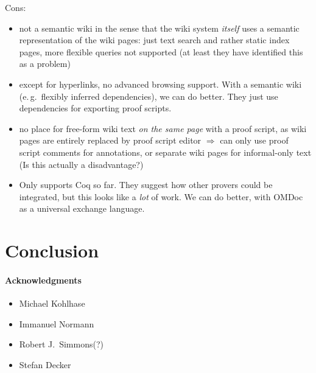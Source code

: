 \documentclass{llncs}
\begin{document}
\begin{todo}
  Cons:
  \begin{itemize}
  \item not a semantic wiki in the sense that the wiki system \emph{itself} uses a
    semantic representation of the wiki pages: just text search and rather static index
    pages, more flexible queries not supported (at least they have identified this as a
    problem)
  \item except for hyperlinks, no advanced browsing support.  With a semantic wiki
    (e.\,g.\ flexibly inferred dependencies), we can do better.  They just use
    dependencies for exporting proof scripts.
  \item no place for free-form wiki text \emph{on the same page} with a proof script, as
    wiki pages are entirely replaced by proof script editor $\Rightarrow$ can only use
    proof script comments for annotations, or separate wiki pages for informal-only text
    (Is this actually a disadvantage?)
  \item Only supports Coq so far.  They suggest how other provers could be integrated, but
    this looks like a \emph{lot} of work.  We can do better, with OMDoc as a universal
    exchange language.
  \end{itemize}
\end{todo}

\section{Conclusion}
\label{sec:conc}


\paragraph{Acknowledgments}
\label{sec:ack}

\begin{itemize}
\item Michael Kohlhase
\item Immanuel Normann
\item Robert J.\ Simmons(?)
\item Stefan Decker
\end{itemize}





\ednotemessage
\end{document}
